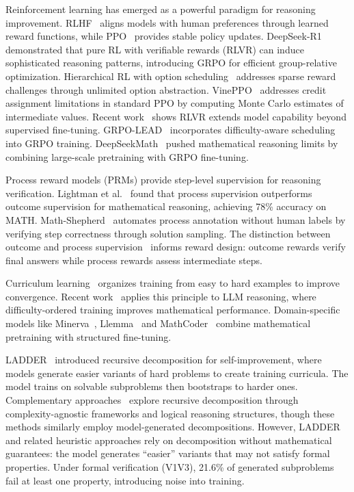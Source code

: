 \documentclass[a4paper,fleqn]{cas-dc}
\theoremstyle{definition}
\begin{document}
Reinforcement learning has emerged as a powerful paradigm for reasoning improvement. RLHF~\cite{rlhf} aligns models with human preferences through learned reward functions, while PPO~\cite{ppo} provides stable policy updates. DeepSeek-R1~\cite{deepseek-r1} demonstrated that pure RL with verifiable rewards (RLVR) can induce sophisticated reasoning patterns, introducing GRPO for efficient group-relative optimization. Hierarchical RL with option scheduling~\cite{uos-hierarchical-rl} addresses sparse reward challenges through unlimited option abstraction. VinePPO~\cite{vineppo} addresses credit assignment limitations in standard PPO by computing Monte Carlo estimates of intermediate values. Recent work~\cite{rlvr} shows RLVR extends model capability beyond supervised fine-tuning. GRPO-LEAD~\cite{grpo-lead} incorporates difficulty-aware scheduling into GRPO training. DeepSeekMath~\cite{deepseekmath} pushed mathematical reasoning limits by combining large-scale pretraining with GRPO fine-tuning.

Process reward models (PRMs) provide step-level supervision for reasoning verification. Lightman et al.~\cite{prm} found that process supervision outperforms outcome supervision for mathematical reasoning, achieving 78\% accuracy on MATH. Math-Shepherd~\cite{math-shepherd} automates process annotation without human labels by verifying step correctness through solution sampling. The distinction between outcome and process supervision~\cite{orm-vs-prm} informs reward design: outcome rewards verify final answers while process rewards assess intermediate steps.

Curriculum learning~\cite{curriculum} organizes training from easy to hard examples to improve convergence. Recent work~\cite{e2h-curriculum} applies this principle to LLM reasoning, where difficulty-ordered training improves mathematical performance. Domain-specific models like Minerva~\cite{minerva}, Llemma~\cite{llemma} and MathCoder~\cite{mathcoder} combine mathematical pretraining with structured fine-tuning.

LADDER~\cite{ladder} introduced recursive decomposition for self-improvement, where models generate easier variants of hard problems to create training curricula. The model trains on solvable subproblems then bootstraps to harder ones. Complementary approaches~\cite{cardt,rdolt} explore recursive decomposition through complexity-agnostic frameworks and logical reasoning structures, though these methods similarly employ model-generated decompositions. However, LADDER and related heuristic approaches rely on decomposition without mathematical guarantees: the model generates ``easier'' variants that may not satisfy formal properties. Under formal verification (V1\textendash V3), 21.6\% of generated subproblems fail at least one property, introducing noise into training.
\end{document}
